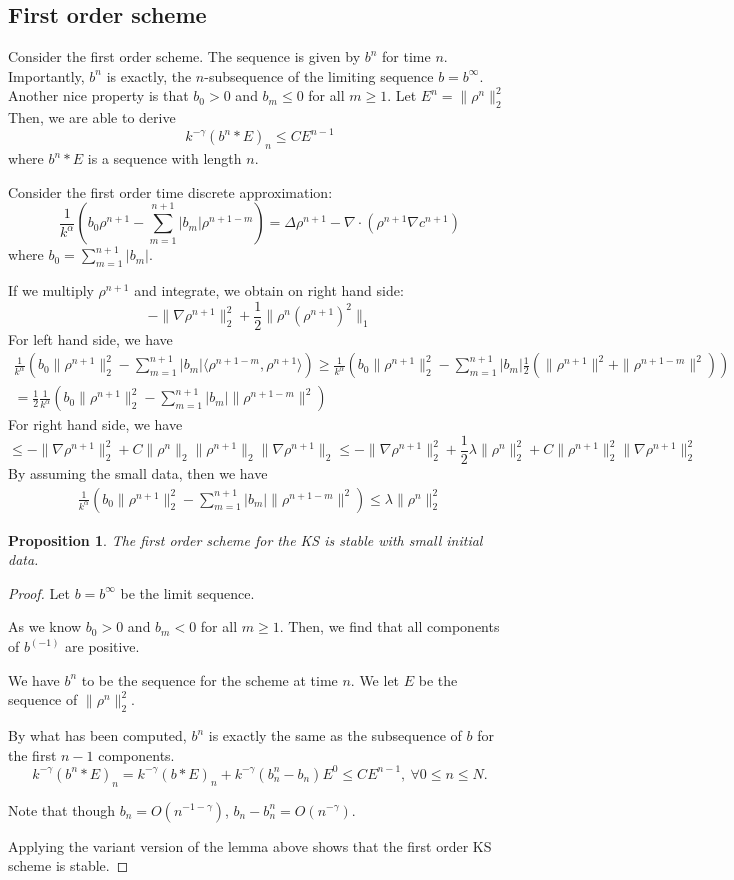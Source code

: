 \documentclass[11pt]{article}
\newtheorem{pro}{Proposition}
\begin{document}
\subsection{First order scheme}
Consider the first order scheme. The sequence is given by $b^n$ for time $n$. Importantly, $b^n$ is exactly, the $n$-subsequence of the limiting sequence $b=b^{\infty}$. Another nice property is that $b_0>0$ and $b_m\le 0$ for all $m\ge 1$. Let $E^n=\|\rho^n\|_2^2$
Then, we are able to derive $$
k^{-\gamma}(b^{n}*E)_n\le CE^{n-1}
$$
where $b^{n}*E$ is a sequence with length $n$.


Consider the first order time discrete approximation: $$
\frac{1}{k^{\alpha}}(b_0\rho^{n+1}-\sum_{m=1}^{n+1}|b_m|\rho^{n+1-m})=\Delta\rho^{n+1}-\nabla\cdot(\rho^{n+1}\nabla c^{n+1})
$$
where $b_0=\sum_{m=1}^{n+1}|b_m|$.

If we multiply $\rho^{n+1}$ and integrate, we obtain on right hand side: $$
-\|\nabla\rho^{n+1}\|_2^2+\frac{1}{2}\|\rho^n(\rho^{n+1})^2\|_1
$$ 
For left hand side, we have
\begin{multline*}
\frac{1}{k^{\alpha}}(b_0\|\rho^{n+1}\|_2^2-\sum_{m=1}^{n+1}|b_m|\langle \rho^{n+1-m}, \rho^{n+1}\rangle)
\ge \frac{1}{k^{\alpha}}(b_0\|\rho^{n+1}\|_2^2-\sum_{m=1}^{n+1}|b_m|\frac{1}{2}(\|\rho^{n+1}\|^2+\|\rho^{n+1-m}\|^2))\\
=\frac{1}{2}\frac{1}{k^{\alpha}}(b_0\|\rho^{n+1}\|_2^2-\sum_{m=1}^{n+1}|b_m|\|\rho^{n+1-m}\|^2)
\end{multline*}
For right hand side, we have $$
\le -\|\nabla\rho^{n+1}\|_2^2+C\|\rho^n\|_2\|\rho^{n+1}\|_2\|\nabla\rho^{n+1}\|_2
\le -\|\nabla\rho^{n+1}\|_2^2+\frac{1}{2}\lambda\|\rho^n\|_2^2+C\|\rho^{n+1}\|_2^2\|\nabla\rho^{n+1}\|_2^2
$$
By assuming the small data, then we have 
\begin{gather*}
\frac{1}{k^{\alpha}}(b_0\|\rho^{n+1}\|_2^2-\sum_{m=1}^{n+1}|b_m|\|\rho^{n+1-m}\|^2)
\le \lambda \|\rho^n\|_2^2
\end{gather*}

\begin{pro}
The first order scheme for the KS is stable with small initial data.
\end{pro}
\begin{proof}
Let $b=b^{\infty}$ be the limit sequence.

As we know $b_0>0$ and $b_m<0$ for all $m\ge 1$. Then, we find that all components of $b^{(-1)}$ are positive.

We have $b^n$ to be the sequence for the scheme at time $n$. We let $E$ be the sequence of $\|\rho^n\|_2^2$.

By what has been computed, $b^n$ is exactly the same as the subsequence of $b$ for the first $n-1$ components. $$
k^{-\gamma}(b^n*E)_n=k^{-\gamma}(b*E)_n+k^{-\gamma}(b_n^n-b_n)E^0\le CE^{n-1},\ \forall 0\le n\le N.
$$

Note that though $b_n=O(n^{-1-\gamma})$, $b_n-b_n^n=O(n^{-\gamma})$.

Applying the variant version of the lemma above shows that the first order KS scheme is stable.
\end{proof}
\end{document}
